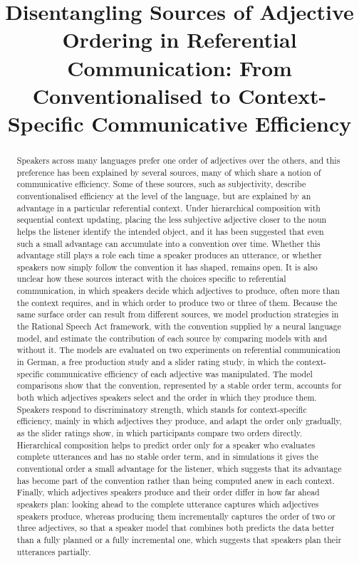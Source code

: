 \documentclass[10pt,a4paper,fleqn]{article}
\title{Disentangling Sources of Adjective Ordering in Referential Communication: From Conventionalised to Context-Specific Communicative Efficiency}
\author{}
\date{}
\begin{document}
\maketitle

\begin{abstract}
\noindent
Speakers across many languages prefer one order of adjectives over the others, and this preference has been explained by several sources, many of which share a notion of communicative efficiency.
Some of these sources, such as subjectivity, describe conventionalised efficiency at the level of the language, but are explained by an advantage in a particular referential context.
Under hierarchical composition with sequential context updating, placing the less subjective adjective closer to the noun helps the listener identify the intended object, and it has been suggested that even such a small advantage can accumulate into a convention over time.
Whether this advantage still plays a role each time a speaker produces an utterance, or whether speakers now simply follow the convention it has shaped, remains open.
It is also unclear how these sources interact with the choices specific to referential communication, in which speakers decide which adjectives to produce, often more than the context requires, and in which order to produce two or three of them.
Because the same surface order can result from different sources, we model production strategies in the Rational Speech Act framework, with the convention supplied by a neural language model, and estimate the contribution of each source by comparing models with and without it.
The models are evaluated on two experiments on referential communication in German, a free production study and a slider rating study, in which the context-specific communicative efficiency of each adjective was manipulated.
The model comparisons show that the convention, represented by a stable order term, accounts for both which adjectives speakers select and the order in which they produce them.
Speakers respond to discriminatory strength, which stands for context-specific efficiency, mainly in which adjectives they produce, and adapt the order only gradually, as the slider ratings show, in which participants compare two orders directly.
Hierarchical composition helps to predict order only for a speaker who evaluates complete utterances and has no stable order term, and in simulations it gives the conventional order a small advantage for the listener, which suggests that its advantage has become part of the convention rather than being computed anew in each context.
Finally, which adjectives speakers produce and their order differ in how far ahead speakers plan: looking ahead to the complete utterance captures which adjectives speakers produce, whereas producing them incrementally captures the order of two or three adjectives, so that a speaker model that combines both predicts the data better than a fully planned or a fully incremental one, which suggests that speakers plan their utterances partially.
\end{abstract}
\end{document}

